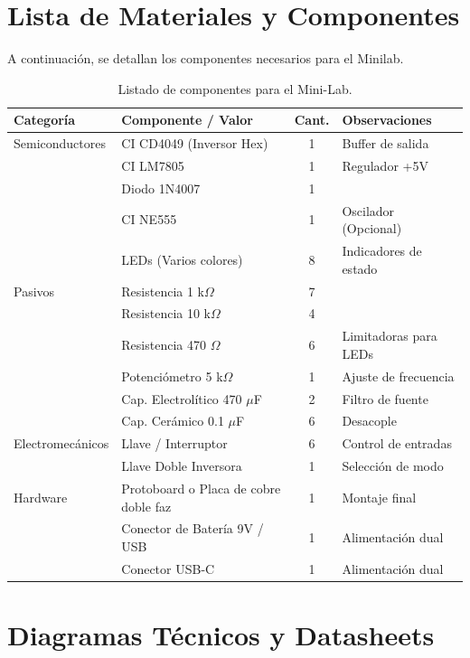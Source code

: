 \documentclass[a4paper,12pt]{article}
\begin{document}
	\section*{Lista de Materiales y Componentes}
	A continuación, se detallan los componentes necesarios para el Minilab.
	
	\begin{table}[H]
		\centering
		\begin{tabular}{@{}llc p{4cm}@{}}
			\toprule
			\textbf{Categoría} & \textbf{Componente / Valor} & \textbf{Cant.} & \textbf{Observaciones} \\
			\midrule
			Semiconductores & CI CD4049 (Inversor Hex) & 1 & Buffer de salida \\
			& CI LM7805 & 1 & Regulador +5V \\
			& Diodo 1N4007 & 1 &  \\
			& CI NE555 & 1 & Oscilador (Opcional) \\
			& LEDs (Varios colores) & 8 & Indicadores de estado \\
			\midrule
			Pasivos & Resistencia 1 k$\Omega$ & 7 & \\
			& Resistencia 10 k$\Omega$ & 4 & \\
			& Resistencia 470 $\Omega$ & 6 & Limitadoras para LEDs \\
			& Potenciómetro 5 k$\Omega$ & 1 & Ajuste de frecuencia \\
			& Cap. Electrolítico 470 $\mu$F & 2 & Filtro de fuente \\
			& Cap. Cerámico 0.1 $\mu$F & 6 & Desacople \\
			\midrule
			Electromecánicos & Llave / Interruptor & 6 & Control de entradas \\
			& Llave Doble Inversora & 1 & Selección de modo \\
			\midrule
			Hardware & Protoboard o Placa de cobre doble faz & 1 & Montaje final \\
			& Conector de Batería 9V / USB & 1 & Alimentación dual \\
			& Conector USB-C & 1 & Alimentación dual \\
			\bottomrule
		\end{tabular}
		\caption{Listado de componentes para el Mini-Lab.}
	\end{table}
	\newpage
	
	
\section*{Diagramas Técnicos y Datasheets}
\end{document}
